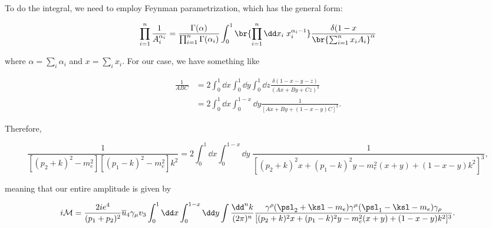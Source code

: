 \section{}

To do the integral, we need to employ Feynman parametrization, which has the general form:

\begin{equation}
  \prod_{i=1}^n \frac{1}{A_i^{\alpha_i}} = \frac{\Gamma(\alpha)}{\prod_{i=1}^n\Gamma(\alpha_i)} \int_0^1 \br{\prod_{i=1}^n \dd x_i \; x_i^{\alpha_i-1}}\frac{\delta(1-x}{\br{\sum_{i=1}^n x_iA_i}^\alpha}
\end{equation}

where $\alpha = \sum_i \alpha_i$ and $x = \sum_i x_i$. For our case, we have something like

\begin{align}
  \frac{1}{ABC} &= 2\int_0^1 \dd x \int_0^1 \dd y \int_0^1 \dd z \frac{\delta(1-x-y-z)}{(Ax + By + Cz)^3} \\
  &= 2 \int_0^1 \dd x \int_0^{1-x} \dd y \frac{1}{[Ax + By + (1-x-y)C]^3}.
\end{align}

Therefore,

\begin{equation}
  \frac{1}{[(p_2+k)^2 - m_e^2][(p_1-k)^2 - m_e^2]k^2} = 2\int_0^1 \dd x \int_0^{1-x} \dd y \; \frac{1}{[(p_2+k)^2x + (p_1-k)^2y - m_e^2(x+y) + (1-x-y)k^2]^3},
\end{equation}

meaning that our entire amplitude is given by

\begin{equation}
  i\mathcal{M} = \frac{2ie^4}{(p_1+p_2)^2} \overline{u}_4 \gamma_\mu v_3 \int_0^1 \dd x \int_0^{1-x} \dd y \int \frac{\dd^nk}{(2\pi)^n} \frac{\gamma^{\rho}(\psl_2 + \ksl - m_e)\gamma^{\mu}(\psl_1 - \ksl - m_e)\gamma_{\rho}}{[(p_2+k)^2x + (p_1-k)^2y - m_e^2(x+y) + (1-x-y)k^2]^3}.
\end{equation}



